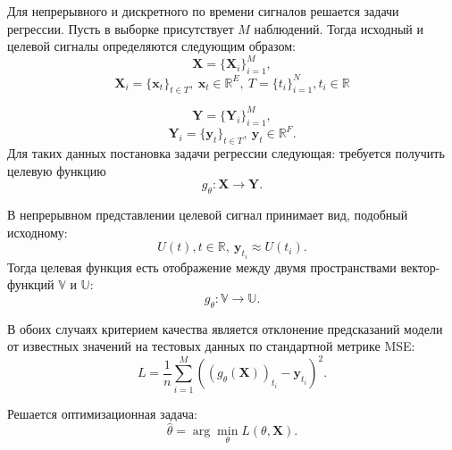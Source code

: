 \documentclass[a4paper, 12pt]{article} %
\newcommand{\V}{\mathbb{V}}
\renewcommand{\U}{\mathbb{U}}
\newcommand{\x}{\mathbf{x}}
\newcommand{\y}{\mathbf{y}}
\newcommand{\Y}{\mathbf{Y}}
\newcommand{\X}{\mathbf{X}}
\newcommand{\R}{\mathbb{R}}
\begin{document}
Для непрерывного и дискретного по времени сигналов решается задачи регрессии. Пусть в выборке присутствует $M$ наблюдений. Тогда исходный и целевой сигналы определяются следующим образом:
$$\X = \{\X_i\}_{i=1}^{M},$$
$$\X_i = \{\x_t\}_{t\in T}, \ \x_t \in \R^E, \ T = \{t_i\}_{i=1}^{N}, t_i \in \R$$ 

$$\Y = \{\Y_i\}_{i=1}^{M},$$
$$\Y_i = \{\y_t\}_{t\in T}, \ \y_t \in \R^F.$$ 
Для таких данных постановка задачи регрессии следующая: требуется получить целевую функцию
$$g_\theta: \X \to \Y.$$

В непрерывном представлении целевой сигнал принимает вид, подобный исходному:
$$U(t), t\in\R, \ \y_{t_i} \approx U(t_i).$$
Тогда целевая функция есть отображение между двумя пространствами вектор-функций $\V$ и $\U$:
$$g_\theta: \V \to \U.$$

В обоих случаях критерием качества является отклонение предсказаний модели от известных значений на тестовых данных по стандартной метрике MSE:
$$L = \frac{1}{n}\sum\limits_{i=1}^{M}\left((g_\theta(\X))_{t_i} - \y_{t_i}\right)^2.$$

Решается оптимизационная задача:
$$\hat{\theta} = \arg\min_{\theta} L(\theta, \X).$$



\end{document}
